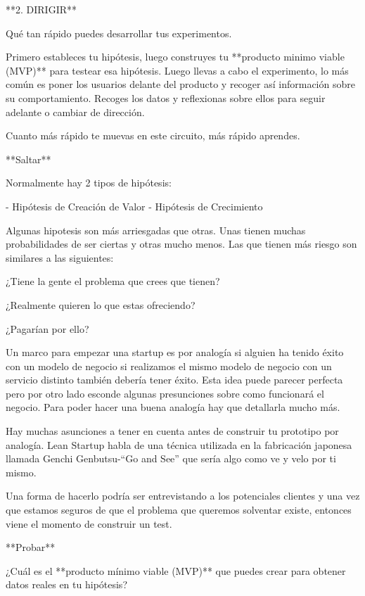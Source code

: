 \documentclass[12pt,twoside,titlepage]{report}
\begin{document}
**2. DIRIGIR**

Qué tan rápido puedes desarrollar tus experimentos.

Primero estableces tu hipótesis, luego construyes tu **producto minimo viable (MVP)** para testear esa hipótesis. Luego llevas a cabo el experimento, lo más común es poner los usuarios delante del producto y recoger así información sobre su comportamiento. Recoges los datos y reflexionas sobre ellos para seguir adelante o cambiar de dirección. 

Cuanto más rápido te muevas en este circuito, más rápido aprendes.

**Saltar**

Normalmente hay 2 tipos de hipótesis: 

- Hipótesis de Creación de Valor
- Hipótesis de Crecimiento

Algunas hipotesis son más arriesgadas que otras. Unas tienen muchas probabilidades de ser ciertas y otras mucho menos. Las que tienen más riesgo son similares a las siguientes: 

¿Tiene la gente el problema que crees que tienen?

¿Realmente quieren lo que estas ofreciendo?

¿Pagarían por ello?

Un marco para empezar una startup es por analogía si alguien ha tenido éxito con un modelo de negocio si realizamos el mismo modelo de negocio con un servicio distinto también debería tener éxito. Esta idea puede parecer perfecta pero por otro lado esconde algunas presunciones sobre como funcionará el negocio. Para poder hacer una buena analogía hay que detallarla mucho más.

Hay muchas asunciones a tener en cuenta antes de construir tu prototipo por analogía. Lean Startup habla de una técnica utilizada en la fabricación japonesa llamada Genchi Genbutsu-“Go and See” que sería algo como ve y velo por ti mismo. 

Una forma de hacerlo podría ser entrevistando a los potenciales clientes y una vez que estamos seguros de que el problema que queremos solventar existe, entonces viene el momento de construir un test.

**Probar**

¿Cuál es el **producto mínimo viable (MVP)** que puedes crear para obtener datos reales en tu hipótesis?
\end{document}
